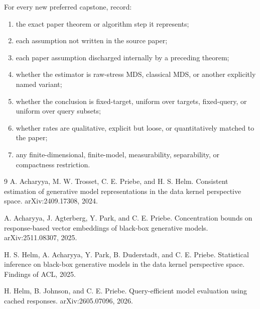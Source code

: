 \documentclass[11pt]{article}
\begin{document}
For every new preferred capstone, record:
\begin{enumerate}
\item the exact paper theorem or algorithm step it represents;
\item each assumption not written in the source paper;
\item each paper assumption discharged internally by a preceding theorem;
\item whether the estimator is raw-stress MDS, classical MDS, or another
      explicitly named variant;
\item whether the conclusion is fixed-target, uniform over targets, fixed-query,
      or uniform over query subsets;
\item whether rates are qualitative, explicit but loose, or quantitatively
      matched to the paper;
\item any finite-dimensional, finite-model, measurability, separability, or
      compactness restriction.
\end{enumerate}

\begin{thebibliography}{9}
A. Acharyya, M. W. Trosset, C. E. Priebe, and H. S. Helm.
\newblock Consistent estimation of generative model representations in the data
kernel perspective space.
\newblock arXiv:2409.17308, 2024.

A. Acharyya, J. Agterberg, Y. Park, and C. E. Priebe.
\newblock Concentration bounds on response-based vector embeddings of black-box
generative models.
\newblock arXiv:2511.08307, 2025.

H. S. Helm, A. Acharyya, Y. Park, B. Duderstadt, and C. E. Priebe.
\newblock Statistical inference on black-box generative models in the data
kernel perspective space.
\newblock Findings of ACL, 2025.

H. Helm, B. Johnson, and C. E. Priebe.
\newblock Query-efficient model evaluation using cached responses.
\newblock arXiv:2605.07096, 2026.
\end{thebibliography}
\end{document}
